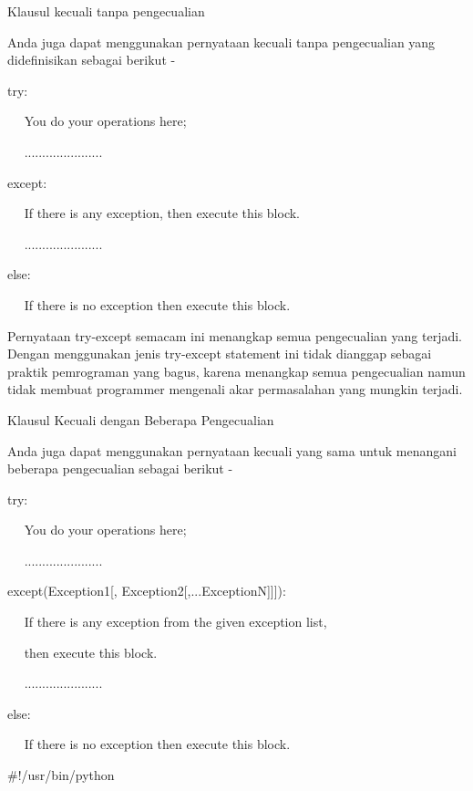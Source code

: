 Klausul kecuali tanpa pengecualian \par
\vspace{12pt}
Anda juga dapat menggunakan pernyataan kecuali tanpa pengecualian yang didefinisikan sebagai berikut - \par
\vspace{12pt}
try: \par
~~ You do your operations here; \par
~~ ...................... \par
except: \par
~~ If there is any exception, then execute this block. \par
~~ ...................... \par
else: \par
~~ If there is no exception then execute this block.  \par
\vspace{12pt}
\vspace{12pt}
Pernyataan try-except semacam ini menangkap semua pengecualian yang terjadi. Dengan menggunakan jenis try-except statement ini tidak dianggap sebagai praktik pemrograman yang bagus, karena menangkap semua pengecualian namun tidak membuat programmer mengenali akar permasalahan yang mungkin terjadi. \par
Klausul Kecuali dengan Beberapa Pengecualian \par
\vspace{12pt}
Anda juga dapat menggunakan pernyataan kecuali yang sama untuk menangani beberapa pengecualian sebagai berikut - \par
\vspace{12pt}
try: \par
~~ You do your operations here; \par
~~ ...................... \par
except(Exception1[, Exception2[,...ExceptionN]]]): \par
~~ If there is any exception from the given exception list,  \par
~~ then execute this block. \par
~~ ...................... \par
else: \par
~~ If there is no exception then execute this block.  \par
\vspace{12pt}
\vspace{12pt}
 $  \#  $!/usr/bin/python \par
\vspace{12pt}
